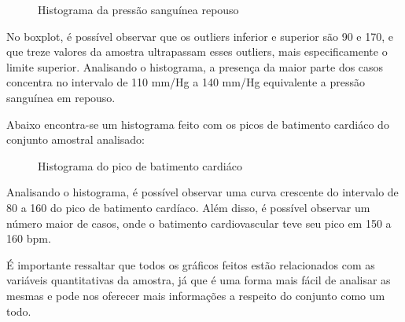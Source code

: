     \begin{figure}[H]
      \centering
      \caption{Histograma da pressão sanguínea repouso }  
    \end{figure}

    No boxplot, é possível observar que os outliers inferior e superior são 90 e 170, e que treze valores da 
    amostra ultrapassam esses outliers, mais especificamente o limite superior. Analisando o histograma, a 
    presença da maior parte dos casos concentra no intervalo de 110 mm/Hg a 140 mm/Hg equivalente a pressão 
    sanguínea em repouso.

    Abaixo encontra-se um histograma feito com os picos de batimento cardiáco do conjunto amostral analisado:

    \begin{figure}[H]
      \centering
      \caption{Histograma do pico de batimento cardiáco }  
    \end{figure}

    Analisando o histograma, é possível observar uma curva crescente do intervalo de 80 a 160 do pico de batimento 
    cardíaco. Além disso, é possível observar um número maior de casos, onde o batimento cardiovascular teve seu pico 
    em 150 a 160 bpm.

    É importante ressaltar que todos os gráficos feitos estão relacionados com as variáveis quantitativas da amostra, 
    já que é uma forma mais fácil de analisar as mesmas e pode nos oferecer mais informações a respeito do conjunto como 
    um todo.

    \nocite{sobreboxplot}
    \nocite{sobrehistograma}